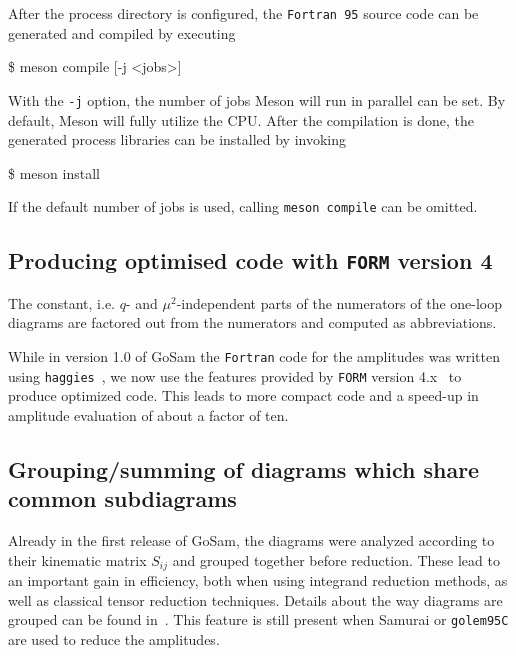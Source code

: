 \documentclass[11pt,a4paper]{refrep}
\newcommand{\gosam}{{\sc GoSam}\xspace}
\newcommand{\golemVC}{{\tt golem95C}\xspace}
\newcommand{\form}{{\tt FORM}\xspace}
\newcommand{\fortranXC}{{\tt Fortran\,95}\xspace}
\newcommand{\haggies}{{\tt haggies}\xspace}
\newcommand{\samurai}{{\sc Samurai}\xspace}
\begin{document}
After the process directory is configured, the \fortranXC source code can be generated and compiled by 
executing
\begin{example}
\$ meson compile [-j <jobs>]
\end{example}
With the {\tt -j} option, the number of jobs Meson will run in parallel can be set. By default, Meson will
fully utilize the CPU. After the compilation is done, the generated process libraries can be installed by
invoking 
\begin{example}
\$ meson install
\end{example}
If the default number of jobs is used, calling {\tt meson compile} can be omitted.


\subsection{Producing optimised code  with {\tt FORM} version 4}

The constant, i.e. $q$- and $\mu^2$-independent parts of the numerators
of the one-loop diagrams are factored out from the numerators and computed
as abbreviations. 

While in version 1.0 of \gosam{} the {\tt Fortran} code for the
amplitudes was written using \haggies~\cite{Reiter:2009ts}, we now
use the features provided by \form{} version
4.x~\cite{Kuipers:2012rf} to produce optimized code. This leads to more
compact code and a speed-up in amplitude evaluation of about a factor
of ten.

\subsection{Grouping/summing of diagrams which share common subdiagrams}
\label{sec:grouping_summing}
Already in the first release of \gosam{}, the diagrams were analyzed
according to their kinematic matrix $S_{ij}$ and grouped together
before reduction. These lead to an important gain in efficiency, both
when using integrand reduction methods, as well as 
classical tensor reduction techniques. Details about the way diagrams
are grouped can be found in~\cite{Cullen:2011ac}. This feature is
still present when \samurai{} or \golemVC{} are used to reduce the
amplitudes.
\end{document}
